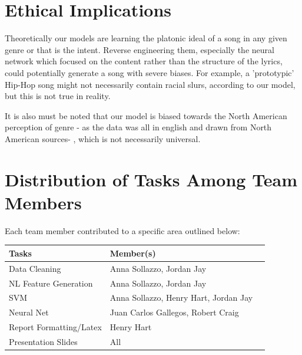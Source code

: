 \documentclass[journal]{IEEEtran}
\begin{document}
\section{Ethical Implications}

Theoretically our models are learning the platonic ideal of a song in any given genre or that is the intent. Reverse engineering them, especially the neural network which focused on the content rather than the structure of the lyrics, could potentially generate a song with severe biases. For example, a 'prototypic' Hip-Hop song might not necessarily contain racial slurs, according to our model, but this is not true in reality.

It is also must be noted that our model is biased towards the North American perception of genre - as the data was all in english and drawn from North American sources- , which is not necessarily universal.

\newpage
\section{Distribution of Tasks Among Team Members}

Each team member contributed to a specific area outlined below:

\begin{table}[h!]
    \label{tab:table1}
    \begin{tabular}{l|l|l|}
      \textbf{Tasks} & \textbf{Member(s)}\\

      \hline
	Data Cleaning & Anna Sollazzo, Jordan Jay\\
	NL Feature Generation & Anna Sollazzo, Jordan Jay\\
	SVM & Anna Sollazzo, Henry Hart, Jordan Jay\\
	Neural Net & Juan Carlos Gallegos, Robert Craig\\
	Report Formatting/Latex & Henry Hart\\
	Presentation Slides & All\\

    \end{tabular}
\end{table}
\end{document}
